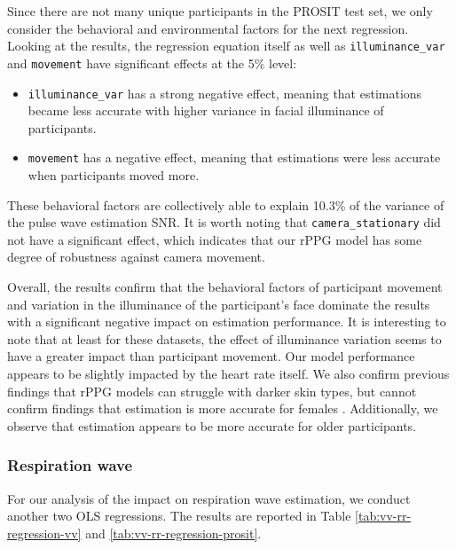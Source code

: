 \documentclass{article}
\begin{document}
Since there are not many unique participants in the PROSIT test set, we only consider the behavioral and environmental factors for the next regression.
Looking at the results, the regression equation itself as well as \texttt{illuminance\_var} and \texttt{movement} have significant effects at the 5\% level: 

\begin{itemize}
	\item \texttt{illuminance\_var} has a strong negative effect, meaning that estimations became less accurate with higher variance in facial illuminance of participants.
	\item \texttt{movement} has a negative effect, meaning that estimations were less accurate when participants moved more.
\end{itemize}

These behavioral factors are collectively able to explain 10.3\% of the variance of the pulse wave estimation SNR.
It is worth noting that \texttt{camera\_stationary} did not have a significant effect, which indicates that our rPPG model has some degree of robustness against camera movement.

Overall, the results confirm that the behavioral factors of participant movement and variation in the illuminance of the participant's face dominate the results with a significant negative impact on estimation performance.
It is interesting to note that at least for these datasets, the effect of illuminance variation seems to have a greater impact than participant movement.
Our model performance appears to be slightly impacted by the heart rate itself.
We also confirm previous findings that rPPG models can struggle with darker skin types, but cannot confirm findings that estimation is more accurate for females \cite{nowara2020meta}.
Additionally, we observe that estimation appears to be more accurate for older participants.

\subsubsection{Respiration wave}

For our analysis of the impact on respiration wave estimation, we conduct another two OLS regressions.
The results are reported in Table \ref{tab:vv-rr-regression-vv} and \ref{tab:vv-rr-regression-prosit}.
\end{document}

